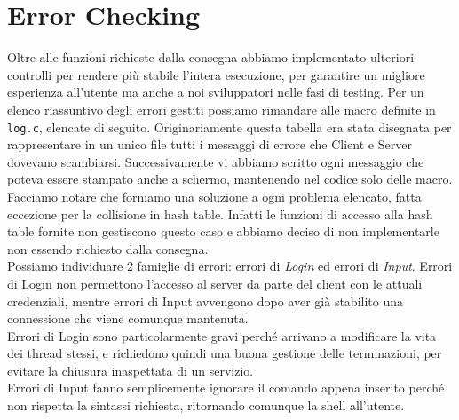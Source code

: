 \documentclass[a4paper, 11pt]{article} %
\begin{document}
\section*{Error Checking}
Oltre alle funzioni richieste dalla consegna abbiamo implementato ulteriori controlli per rendere più stabile l'intera esecuzione, per garantire un migliore esperienza all'utente ma anche a noi sviluppatori nelle fasi di testing. Per un elenco riassuntivo degli errori gestiti possiamo rimandare alle macro definite in \texttt{log.c}, elencate di seguito. 
Originariamente questa tabella era stata disegnata per rappresentare in un unico file tutti i messaggi di errore che Client e Server dovevano scambiarsi. Successivamente vi abbiamo scritto ogni messaggio che poteva essere stampato anche a schermo, mantenendo nel codice solo delle macro. Facciamo notare che forniamo una soluzione a ogni problema elencato, fatta eccezione per la collisione in hash table. Infatti le funzioni di accesso alla hash table fornite non gestiscono questo caso e abbiamo deciso di non implementarle non essendo richiesto dalla consegna.\\
Possiamo individuare 2 famiglie di errori: errori di \textit{Login} ed errori di \textit{Input}. Errori di Login non permettono l'accesso al server da parte del client con le attuali credenziali, mentre errori di Input avvengono dopo aver già stabilito una connessione che viene comunque mantenuta.\\
Errori di Login sono particolarmente gravi perché arrivano a modificare la vita dei thread stessi, e richiedono quindi una buona gestione delle terminazioni, per evitare la chiusura inaspettata di un servizio.\\
Errori di Input fanno semplicemente ignorare il comando appena inserito perché non rispetta la sintassi richiesta, ritornando comunque la shell all'utente.\\
\end{document}
